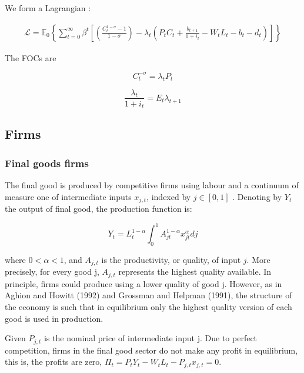 \documentclass[10pt,math=newtx,citestyle=gb7714-2015,bibstyle=gb7714-2015]{elegantbook}
\begin{document}
{{{	We form a Lagrangian :
	
	$$\begin{aligned}\mathcal{L}= \mathbb{E}_{0}\left\{\sum _ { t = 0 } ^ { \infty } \beta ^ { t } \left[\left(\frac{C_{t}^{1-\sigma}-1}{1-\sigma}\right)-\lambda_{t}\left(P_tC_{t}+\frac{b_{t+1}}{1+i_t}-W_{t} L_{t}-b_t-d_{t}\right)\right]\right\}\end{aligned}$$
	
	The FOCs are 
	
	\begin{equation}
		C_t^{-\sigma} = \lambda_t P_t
	\end{equation}
	
	\begin{equation}
		\frac{\lambda_t}{1+i_t} = E_t \lambda_{t+1}
	\end{equation}
	
	\subsection{Firms}
	
	\subsubsection{Final goods firms}
	
	The final good is produced by competitive firms using labour and a continuum of measure one of intermediate inputs $x_{j,t}$, indexed by $j \in [0,1]$ . Denoting by $Y_t$ the output of final good, the production function is:
	
	\begin{equation}
		Y_{t}=L_{t}^{1-\alpha} \int_{0}^{1} A_{j t}^{1-\alpha} x_{j t}^{\alpha} d j
	\end{equation}
	
	where $0<\alpha<1$, and $A_{j,t}$ is the productivity, or quality, of input $j$. More precisely, for every good j, $A_{j,t}$ represents the highest quality available. In principle, firms could produce using a lower quality of good j. However, as in Aghion and Howitt (1992) and Grossman and Helpman (1991), the structure of the economy is such that in equilibrium only the highest quality version of each good is used in production.
	
	Given $P_{j,t}$ is the nominal price of intermediate input j. Due to perfect competition, firms in the final good sector do not make any profit in equilibrium, this is, the profits are zero, $\Pi_t = P_t Y_t - W_t L_t - P_{j,t} x_{j,t}=0$.
	
}}}
\end{document}
